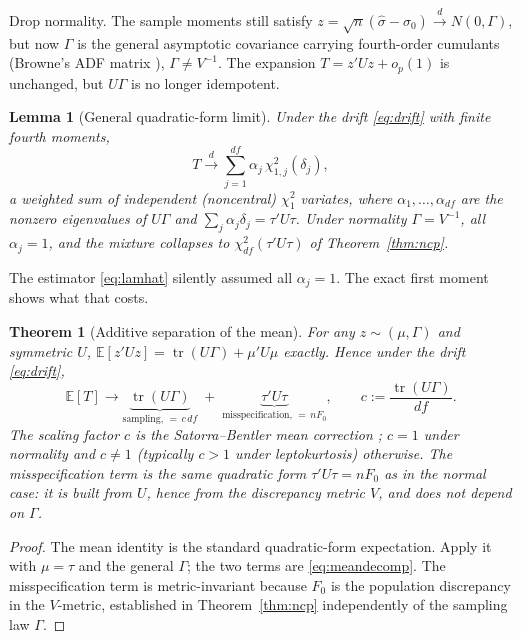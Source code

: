 \documentclass[11pt]{article}
\newcommand{\E}{\mathbb{E}}
\newcommand{\tr}{\operatorname{tr}}
\newcommand{\dto}{\xrightarrow{d}}
\theoremstyle{plain}
\newtheorem{theorem}{Theorem}
\newtheorem{lemma}{Lemma}
\theoremstyle{remark}
\begin{document}
Drop normality. The sample moments still satisfy
$z=\sqrt n(\hat\sigma-\sigma_0)\dto N(0,\Gamma)$, but now $\Gamma$ is the general
asymptotic covariance carrying fourth-order cumulants (Browne's ADF matrix
\cite{browne1984}), $\Gamma\ne V^{-1}$. The expansion $T=z'Uz+o_p(1)$ is
unchanged, but $U\Gamma$ is no longer idempotent.

\begin{lemma}[General quadratic-form limit]\label{lem:mixture}
Under the drift \eqref{eq:drift} with finite fourth moments,
\[
  T \dto \sum_{j=1}^{df} \alpha_j\,\chi^2_{1,j}(\delta_j),
\]
a weighted sum of independent (noncentral) $\chi^2_1$ variates, where
$\alpha_1,\dots,\alpha_{df}$ are the nonzero eigenvalues of $U\Gamma$ and
$\sum_j\alpha_j\delta_j=\tau'U\tau$. Under normality $\Gamma=V^{-1}$,
all $\alpha_j=1$, and the mixture collapses to $\chi^2_{df}(\tau'U\tau)$ of
Theorem~\ref{thm:ncp}.
\end{lemma}

The estimator \eqref{eq:lamhat} silently assumed all $\alpha_j=1$. The exact
first moment shows what that costs.

\begin{theorem}[Additive separation of the mean]\label{thm:robust}
For any $z\sim(\mu,\Gamma)$ and symmetric $U$, $\E[z'Uz]=\tr(U\Gamma)+\mu'U\mu$
\emph{exactly}. Hence under the drift \eqref{eq:drift},
\begin{equation}\label{eq:meandecomp}
  \E[T] \to \underbrace{\tr(U\Gamma)}_{\text{sampling, }=\,c\,df}
            \;+\;\underbrace{\tau'U\tau}_{\text{misspecification, }=\,nF_0},
  \qquad
  c := \frac{\tr(U\Gamma)}{df}.
\end{equation}
The scaling factor $c$ is the Satorra--Bentler mean correction
\cite{satorrabentler1994,satorra1989}; $c=1$ under normality and $c\ne1$
(typically $c>1$ under leptokurtosis) otherwise. The misspecification term is
the \emph{same} quadratic form $\tau'U\tau=nF_0$ as in the normal case: it is
built from $U$, hence from the discrepancy metric $V$, and does not depend on
$\Gamma$.
\end{theorem}

\begin{proof}
The mean identity is the standard quadratic-form expectation. Apply it with
$\mu=\tau$ and the general $\Gamma$; the two terms are \eqref{eq:meandecomp}. The
misspecification term is metric-invariant because $F_0$ is the population
discrepancy in the $V$-metric, established in Theorem~\ref{thm:ncp} independently
of the sampling law $\Gamma$.
\end{proof}
\end{document}
